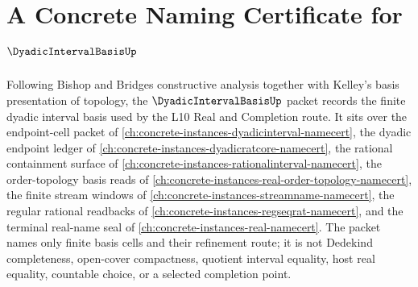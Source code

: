 \chapter{A Concrete Naming Certificate for $\DyadicIntervalBasisUp$}
\label{ch:concrete-instances-dyadic-interval-basis-namecert}

Following Bishop and Bridges constructive analysis together with Kelley's basis presentation of topology, the $\DyadicIntervalBasisUp$ packet records the finite dyadic interval basis used by the L10 Real and Completion route. It sits over the endpoint-cell packet of \autoref{ch:concrete-instances-dyadicinterval-namecert}, the dyadic endpoint ledger of \autoref{ch:concrete-instances-dyadicratcore-namecert}, the rational containment surface of \autoref{ch:concrete-instances-rationalinterval-namecert}, the order-topology basis reads of \autoref{ch:concrete-instances-real-order-topology-namecert}, the finite stream windows of \autoref{ch:concrete-instances-streamname-namecert}, the regular rational readbacks of \autoref{ch:concrete-instances-regseqrat-namecert}, and the terminal real-name seal of \autoref{ch:concrete-instances-real-namecert}. The packet names only finite basis cells and their refinement route; it is not Dedekind completeness, open-cover compactness, quotient interval equality, host real equality, countable choice, or a selected completion point.

